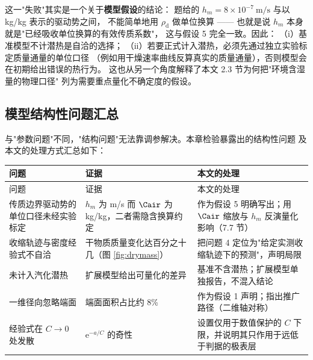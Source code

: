 这一"失败"其实是一个关于\textbf{模型假设}的结论：
题给的 $h_m=8\times10^{-7}\ \mathrm{m/s}$ 与以 kg/kg 表示的驱动势之间，
不能简单地用 $\rho_{\mathrm{d}}$ 做单位换算 ——
也就是说 $h_m$ 本身就是"已经吸收单位换算的有效传质系数"，
这与假设 5 完全一致。因此：
（i）基准模型不计潜热是自洽的选择；
（ii）若要正式计入潜热，必须先通过独立实验标定质量通量的单位口径
（例如用干燥速率曲线反算真实的质量通量），否则模型会在初期给出错误的热行为。
这也从另一个角度解释了本文 2.3 节为何把"环境含湿量的物理口径"
列为需要重点量化不确定度的假设。

\subsection{模型结构性问题汇总}

与"参数问题"不同，"结构问题"无法靠调参解决。本章检验暴露出的结构性问题
及本文的处理方式汇总如下：

\begin{center}
\small
\begin{longtable}{@{}p{4.2cm}p{4.0cm}p{6.3cm}@{}}
\toprule
问题 & 证据 & 本文的处理 \\
\midrule
\endfirsthead
\toprule
问题 & 证据 & 本文的处理 \\
\midrule
\endhead
传质边界驱动势的单位口径未经实验标定
 & $h_m$ 为 m/s 而 $\Cair$ 为 kg/kg，二者需隐含换算约定
 & 作为假设 5 明确写出；用 $\Cair$ 缩放与 $h_m$ 反演量化影响（7.7 节） \\
收缩轨迹与密度经验式不自洽
 & 干物质质量变化达百分之十几（图 \ref{fig:drymass}）
 & 把问题 4 定位为"给定实测收缩轨迹下的预测"，声明局限 \\
未计入汽化潜热
 & 扩展模型给出可量化的差异
 & 基准不含潜热；扩展模型单独报告，不混入结论 \\
一维径向忽略端面
 & 端面面积占比约 8\%
 & 作为假设 1 声明；指出推广路径（二维轴对称） \\
经验式在 $C\to0$ 处发散
 & $\mathrm{e}^{-a/C}$ 的奇性
 & 设置仅用于数值保护的 $C$ 下限，并说明其只作用于远低于判据的极表层 \\
\bottomrule
\end{longtable}
\end{center}

